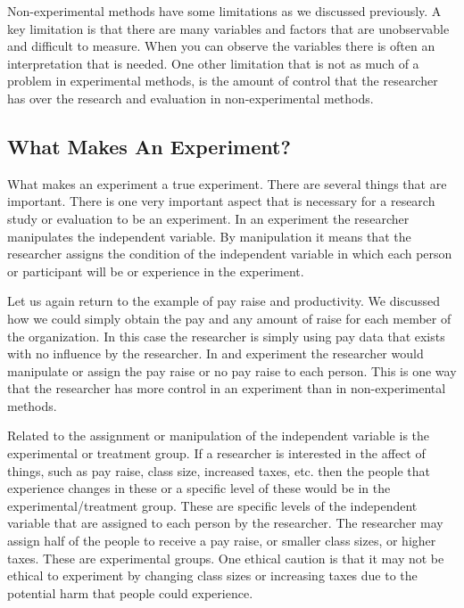 \documentclass[]{book}
\theoremstyle{definition}
\theoremstyle{definition}
\theoremstyle{definition}
\theoremstyle{remark}
\begin{document}
Non-experimental methods have some limitations as we discussed
previously. A key limitation is that there are many variables and
factors that are unobservable and difficult to measure. When you can
observe the variables there is often an interpretation that is needed.
One other limitation that is not as much of a problem in experimental
methods, is the amount of control that the researcher has over the
research and evaluation in non-experimental methods.

\hypertarget{what-makes-an-experiment}{%
\subsection{What Makes An Experiment?}\label{what-makes-an-experiment}}

What makes an experiment a true experiment. There are several things
that are important. There is one very important aspect that is necessary
for a research study or evaluation to be an experiment. In an experiment
the researcher manipulates the independent variable. By manipulation it
means that the researcher assigns the condition of the independent
variable in which each person or participant will be or experience in
the experiment.

Let us again return to the example of pay raise and productivity. We
discussed how we could simply obtain the pay and any amount of raise for
each member of the organization. In this case the researcher is simply
using pay data that exists with no influence by the researcher. In and
experiment the researcher would manipulate or assign the pay raise or no
pay raise to each person. This is one way that the researcher has more
control in an experiment than in non-experimental methods.

Related to the assignment or manipulation of the independent variable is
the experimental or treatment group. If a researcher is interested in
the affect of things, such as pay raise, class size, increased taxes,
etc. then the people that experience changes in these or a specific
level of these would be in the experimental/treatment group. These are
specific levels of the independent variable that are assigned to each
person by the researcher. The researcher may assign half of the people
to receive a pay raise, or smaller class sizes, or higher taxes. These
are experimental groups. One ethical caution is that it may not be
ethical to experiment by changing class sizes or increasing taxes due to
the potential harm that people could experience.
\end{document}
